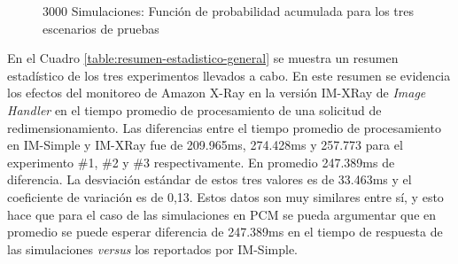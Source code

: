 \begin{figure}
\hspace{-2cm}
\caption{3000 Simulaciones: Función de probabilidad acumulada para los tres escenarios de pruebas}
\label{fig-probabilidad-acumulada-3-casos}
\end{figure}

En el Cuadro \ref{table:resumen-estadistico-general} se muestra un resumen estadístico de los tres experimentos llevados a cabo. En este resumen se evidencia los efectos del monitoreo de Amazon X-Ray en la versión IM-XRay de \emph{Image Handler} en el tiempo promedio de procesamiento de una solicitud de redimensionamiento. Las diferencias entre el tiempo promedio de procesamiento en IM-Simple y IM-XRay fue de 209.965ms, 274.428ms y 257.773 para el experimento \#1, \#2 y \#3 respectivamente. En promedio 247.389ms de diferencia. La desviación estándar de estos tres valores es de 33.463ms y el coeficiente de variación es de 0,13. Estos datos son muy similares entre sí, y esto hace que para el caso de las simulaciones en PCM se pueda argumentar que en promedio se puede esperar diferencia de 247.389ms en el tiempo de respuesta de las simulaciones \emph{versus} los reportados por IM-Simple.

